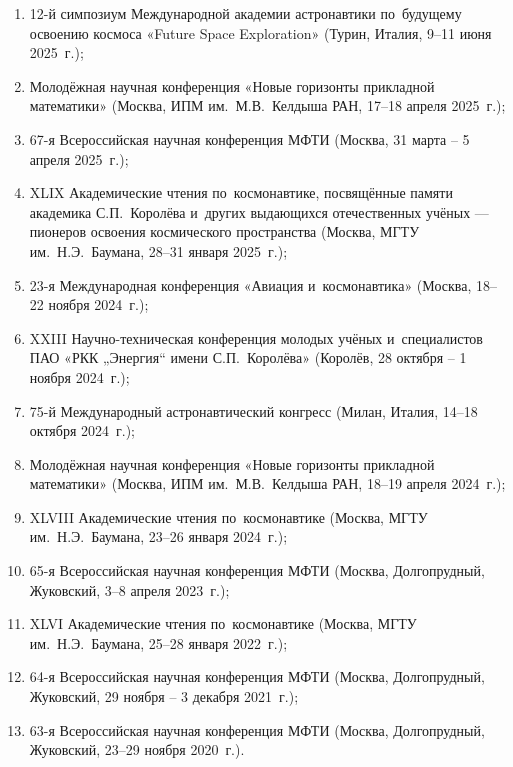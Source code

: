 \begin{enumerate}
    \item 12-й симпозиум Международной академии астронавтики по~будущему освоению космоса «Future Space Exploration»
    (Турин, Италия, 9--11 июня 2025~г.);

    \item Молодёжная научная конференция «Новые горизонты прикладной математики»
    (Москва, ИПМ им.~М.В.~Келдыша РАН, 17--18 апреля 2025~г.);

    \item 67-я Всероссийская научная конференция МФТИ
    (Москва, 31 марта -- 5 апреля 2025~г.);

    \item XLIX Академические чтения по~космонавтике, посвящённые памяти академика С.П.~Королёва и~других выдающихся отечественных учёных --- пионеров освоения космического пространства
    (Москва, МГТУ им.~Н.Э.~Баумана, 28--31 января 2025~г.);

    \item 23-я Международная конференция «Авиация и~космонавтика»
    (Москва, 18--22 ноября 2024~г.);

    \item XXIII Научно-техническая конференция молодых учёных и~специалистов ПАО «РКК „Энергия“ имени С.П.~Королёва»
    (Королёв, 28 октября -- 1 ноября 2024~г.);

    \item 75-й Международный астронавтический конгресс
    (Милан, Италия, 14--18 октября 2024~г.);

    \item Молодёжная научная конференция «Новые горизонты прикладной математики»
    (Москва, ИПМ им.~М.В.~Келдыша РАН, 18--19 апреля 2024~г.);

    \item XLVIII Академические чтения по~космонавтике
    (Москва, МГТУ им.~Н.Э.~Баумана, 23--26 января 2024~г.);

    \item 65-я Всероссийская научная конференция МФТИ
    (Москва, Долгопрудный, Жуковский, 3--8 апреля 2023~г.);

    \item XLVI Академические чтения по~космонавтике
    (Москва, МГТУ им.~Н.Э.~Баумана, 25--28 января 2022~г.);

    \item 64-я Всероссийская научная конференция МФТИ
    (Москва, Долгопрудный, Жуковский, 29 ноября -- 3 декабря 2021~г.);

    \item 63-я Всероссийская научная конференция МФТИ
    (Москва, Долгопрудный, Жуковский, 23--29 ноября 2020~г.).
\end{enumerate}

